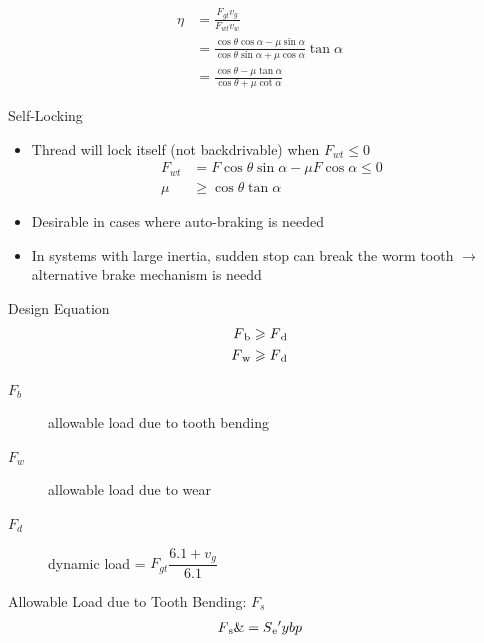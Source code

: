 \documentclass[a4paper,openany]{tufte-book}
\begin{document}
\begin{align}
    \eta &= \frac{F_{gt}v_{g}}{F_{wt}v_{w}} \\
         &= \frac{\cos \theta \cos \alpha - \mu \sin \alpha}{\cos \theta \sin \alpha + \mu \cos \alpha} \tan \alpha \\
         &= \frac{\cos \theta - \mu \tan \alpha}{\cos \theta + \mu \cot \alpha}
  \end{align}

Self-Locking

\begin{itemize}
\item Thread will lock itself (not backdrivable) when \(F_{wt} \leqslant 0\)
\begin{align}
            F_{wt} &= F \cos \theta \sin \alpha - \mu F \cos \alpha \leqslant 0 \\
            \mu &\geqslant \cos \theta \tan \alpha
          \end{align}

\item Desirable in cases where auto-braking is needed

\item In systems with large inertia, sudden stop can break the worm tooth
\(\rightarrow\) alternative brake mechanism is needd
\end{itemize}

Design Equation \begin{align}
    F\textsubscript{b} \geqslant F\textsubscript{d} \\
    F\textsubscript{w} \geqslant F\textsubscript{d}
  \end{align}

\begin{description}
\item[{\(F_{b}\)}] allowable load due to tooth bending

\item[{\(F_{w}\)}] allowable load due to wear

\item[{\(F_{d}\)}] dynamic load = \(F_{gt} \dfrac{6.1 + v_{g}}{6.1}\)
\end{description}

Allowable Load due to Tooth Bending: \(F_{s}\) \begin{align}
    F\textsubscript{s} \&= S\textsubscript{e}\textsuperscript{\(\prime\)}ybp
  \end{align}
\end{document}
